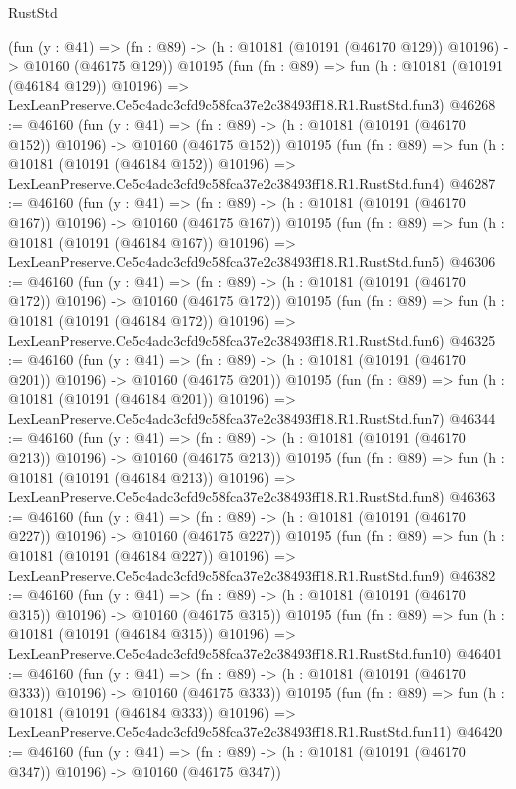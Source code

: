 \begin{lexlean}{RustStd}
\begin{coremodule}
    (fun (y : @41) =>
    (fn : @89) -> (h : @10181 (@10191 (@46170 @129)) @10196) -> @10160 (@46175 @129))
    @10195
    (fun (fn : @89) =>
    fun (h : @10181 (@10191 (@46184 @129)) @10196) =>
    LexLeanPreserve.Ce5c4adc3cfd9c58fca37e2c38493ff18.R1.RustStd.fun3)
@46268 := @46160
    (fun (y : @41) =>
    (fn : @89) -> (h : @10181 (@10191 (@46170 @152)) @10196) -> @10160 (@46175 @152))
    @10195
    (fun (fn : @89) =>
    fun (h : @10181 (@10191 (@46184 @152)) @10196) =>
    LexLeanPreserve.Ce5c4adc3cfd9c58fca37e2c38493ff18.R1.RustStd.fun4)
@46287 := @46160
    (fun (y : @41) =>
    (fn : @89) -> (h : @10181 (@10191 (@46170 @167)) @10196) -> @10160 (@46175 @167))
    @10195
    (fun (fn : @89) =>
    fun (h : @10181 (@10191 (@46184 @167)) @10196) =>
    LexLeanPreserve.Ce5c4adc3cfd9c58fca37e2c38493ff18.R1.RustStd.fun5)
@46306 := @46160
    (fun (y : @41) =>
    (fn : @89) -> (h : @10181 (@10191 (@46170 @172)) @10196) -> @10160 (@46175 @172))
    @10195
    (fun (fn : @89) =>
    fun (h : @10181 (@10191 (@46184 @172)) @10196) =>
    LexLeanPreserve.Ce5c4adc3cfd9c58fca37e2c38493ff18.R1.RustStd.fun6)
@46325 := @46160
    (fun (y : @41) =>
    (fn : @89) -> (h : @10181 (@10191 (@46170 @201)) @10196) -> @10160 (@46175 @201))
    @10195
    (fun (fn : @89) =>
    fun (h : @10181 (@10191 (@46184 @201)) @10196) =>
    LexLeanPreserve.Ce5c4adc3cfd9c58fca37e2c38493ff18.R1.RustStd.fun7)
@46344 := @46160
    (fun (y : @41) =>
    (fn : @89) -> (h : @10181 (@10191 (@46170 @213)) @10196) -> @10160 (@46175 @213))
    @10195
    (fun (fn : @89) =>
    fun (h : @10181 (@10191 (@46184 @213)) @10196) =>
    LexLeanPreserve.Ce5c4adc3cfd9c58fca37e2c38493ff18.R1.RustStd.fun8)
@46363 := @46160
    (fun (y : @41) =>
    (fn : @89) -> (h : @10181 (@10191 (@46170 @227)) @10196) -> @10160 (@46175 @227))
    @10195
    (fun (fn : @89) =>
    fun (h : @10181 (@10191 (@46184 @227)) @10196) =>
    LexLeanPreserve.Ce5c4adc3cfd9c58fca37e2c38493ff18.R1.RustStd.fun9)
@46382 := @46160
    (fun (y : @41) =>
    (fn : @89) -> (h : @10181 (@10191 (@46170 @315)) @10196) -> @10160 (@46175 @315))
    @10195
    (fun (fn : @89) =>
    fun (h : @10181 (@10191 (@46184 @315)) @10196) =>
    LexLeanPreserve.Ce5c4adc3cfd9c58fca37e2c38493ff18.R1.RustStd.fun10)
@46401 := @46160
    (fun (y : @41) =>
    (fn : @89) -> (h : @10181 (@10191 (@46170 @333)) @10196) -> @10160 (@46175 @333))
    @10195
    (fun (fn : @89) =>
    fun (h : @10181 (@10191 (@46184 @333)) @10196) =>
    LexLeanPreserve.Ce5c4adc3cfd9c58fca37e2c38493ff18.R1.RustStd.fun11)
@46420 := @46160
    (fun (y : @41) =>
    (fn : @89) -> (h : @10181 (@10191 (@46170 @347)) @10196) -> @10160 (@46175 @347))

\end{coremodule}
\end{lexlean}
